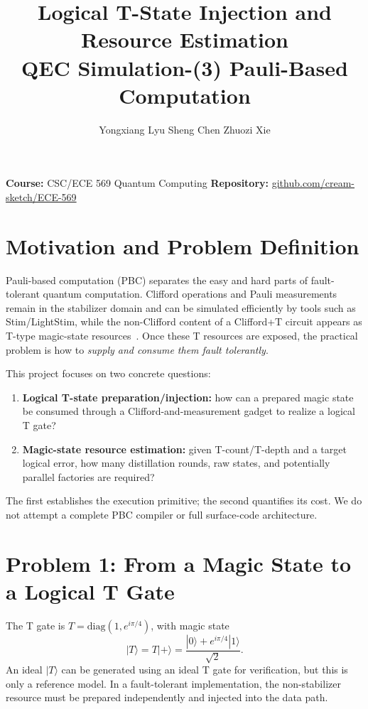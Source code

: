 \documentclass[10pt]{article}
\title{\vspace{-1.35cm}\textbf{Logical T-State Injection and Resource Estimation}\\
\large QEC Simulation-(3) Pauli-Based Computation}
\author{Yongxiang Lyu \qquad Sheng Chen \qquad Zhuozi Xie}
\date{}
\begin{document}
\maketitle
\vspace{-1.1em}

\textbf{Course:} CSC/ECE 569 Quantum Computing \hfill
\textbf{Repository:} \href{https://github.com/cream-sketch/ECE-569}{github.com/cream-sketch/ECE-569}

\section{Motivation and Problem Definition}

Pauli-based computation (PBC) separates the easy and hard parts of fault-tolerant quantum computation. Clifford operations and Pauli measurements remain in the stabilizer domain and can be simulated efficiently by tools such as Stim/LightStim, while the non-Clifford content of a Clifford+T circuit appears as T-type magic-state resources~\cite{gidney2021stim,peres2022pbc}. Once these T resources are exposed, the practical problem is how to \emph{supply and consume them fault tolerantly}.

This project focuses on two concrete questions:
\begin{enumerate}
\item \textbf{Logical T-state preparation/injection:} how can a prepared magic state be consumed through a Clifford-and-measurement gadget to realize a logical T gate?
\item \textbf{Magic-state resource estimation:} given T-count/T-depth and a target logical error, how many distillation rounds, raw states, and potentially parallel factories are required?
\end{enumerate}
The first establishes the execution primitive; the second quantifies its cost. We do not attempt a complete PBC compiler or full surface-code architecture.

\section{Problem 1: From a Magic State to a Logical T Gate}

The T gate is $T=\mathrm{diag}(1,e^{i\pi/4})$, with magic state
\[
|T\rangle=T|+\rangle=\frac{|0\rangle+e^{i\pi/4}|1\rangle}{\sqrt{2}}.
\]
An ideal $|T\rangle$ can be generated using an ideal T gate for verification, but this is only a reference model. In a fault-tolerant implementation, the non-stabilizer resource must be prepared independently and injected into the data path.
\end{document}

